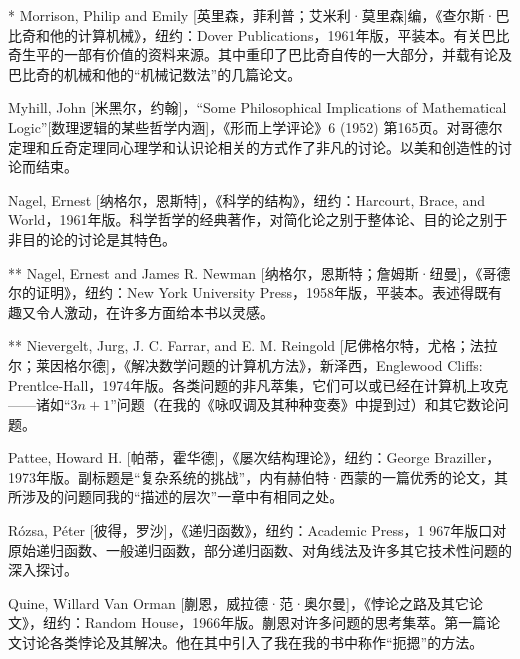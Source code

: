 \begin{thebib}
\begin{biblist}
\item[*] Morrison, Philip and Emily [英里森，菲利普；艾米利·莫里森]编，《查尔斯·巴比奇和他的计算机械》，纽约：Dover Publications，1961年版，平装本。有关巴比奇生平的一部有价值的资料来源。其中重印了巴比奇自传的一大部分，并载有论及巴比奇的机械和他的“机械记数法”的几篇论文。

\item Myhill, John [米黑尔，约翰]，“Some Philosophical Implications of Mathematical Logic”[数理逻辑的某些哲学内涵]，《形而上学评论》6 (1952) 第165页。对哥德尔定理和丘奇定理同心理学和认识论相关的方式作了非凡的讨论。以美和创造性的讨论而结束。

\item Nagel, Ernest [纳格尔，恩斯特]，《科学的结构》，纽约：Harcourt, Brace, and World，1961年版。科学哲学的经典著作，对简化论之别于整体论、目的论之别于非目的论的讨论是其特色。

\item[**] Nagel, Ernest and James R. Newman [纳格尔，恩斯特；詹姆斯·纽曼]，《哥德尔的证明》，纽约：New York University Press，1958年版，平装本。表述得既有趣又令人激动，在许多方面给本书以灵感。

\item[**] Nievergelt, Jurg, J. C. Farrar, and E. M. Reingold [尼佛格尔特，尤格；法拉尔；莱因格尔德]，《解决数学问题的计算机方法》，新泽西，Englewood Cliffs: Prentlce-Hall，1974年版。各类问题的非凡萃集，它们可以或已经在计算机上攻克——诸如“$3n+1$”问题（在我的《咏叹调及其种种变奏》中提到过）和其它数论问题。

\item Pattee, Howard H. [帕蒂，霍华德]，《屡次结构理论》，纽约：George Braziller，1973年版。副标题是“复杂系统的挑战”，内有赫伯特·西蒙的一篇优秀的论文，其所涉及的问题同我的“描述的层次”一章中有相同之处。

\item Rózsa, Péter [彼得，罗沙]，《递归函数》，纽约：Academic Press，1 967年版口对原始递归函数、一般递归函数，部分递归函数、对角线法及许多其它技术性问题的深入探讨。

\item Quine, Willard Van Orman [蒯恩，威拉德·范·奥尔曼]，《悖论之路及其它论文》，纽约：Random House，1966年版。蒯恩对许多问题的思考集萃。第一篇论文讨论各类悖论及其解决。他在其中引入了我在我的书中称作“扼摁”的方法。


\end{biblist}
\end{thebib}
